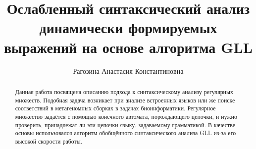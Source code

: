 \title{Ослабленный синтаксический анализ динамически формируемых выражений на основе алгоритма GLL}


\author{Рагозина Анастасия Константиновна}



\maketitle             

\begin{abstract}
Данная работа посвящена описанию подхода к синтаксическому анализу регулярных множеств. 
Подобная задача возникает при анализе встроенных языков или же поиске соответствий в 
метагеномных сборках в задачах биоинформатики. Регулярное множество задаётся с помощью 
конечного автомата, порождающего цепочки, и нужно проверить, принадлежат ли эти цепочки 
языку, задаваемому грамматикой. В качестве основы использовался алгоритм обобщённого 
синтаксического анализа GLL из-за его высокой скорости работы.
\end{abstract}









